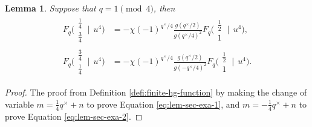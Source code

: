 \documentclass[11pt, reqno]{amsart}
\theoremstyle{plain}
\newtheorem{lem}[theo]{Lemma}
\theoremstyle{definition}
\begin{document}
\begin{lem}
Suppose that $q=1 \pmod{4}$, then 
\begin{align}
F_q\biggl(\begin{matrix} \frac{1}{4} \\ \frac{3}{4} \end{matrix} \:\bigg|\:\: u^{4} \biggr) &= -\chi(-1)^{q^\times/4} \frac{g(q^\times/2)}{g(q^\times/4)^2} F_q\biggl(\begin{matrix} \frac{1}{2} \\ 1 \end{matrix} \:\bigg|\:\: u^{4} \biggr), \label{eq:lem-sec-exa-1}\\
F_q\biggl(\begin{matrix} \frac{3}{4} \\ \frac{1}{4} \end{matrix} \:\bigg|\:\: u^{4} \biggr) &= -\chi(-1)^{q^\times/4} \frac{g(q^\times/2)}{g(-q^\times/4)^2} F_q\biggl(\begin{matrix} \frac{1}{2} \\ 1 \end{matrix} \:\bigg|\:\: u^{4} \biggr).\label{eq:lem-sec-exa-2}
\end{align}
\end{lem}
\begin{proof}
    The proof from Definition \ref{defi:finite-hg-function} by making the change of variable $m= \frac{1}{4}q^\times +n$ to prove Equation \eqref{eq:lem-sec-exa-1}, and $m= -\frac{1}{4}q^\times +n$ to prove Equation \eqref{eq:lem-sec-exa-2}.
\end{proof}
\end{document}
